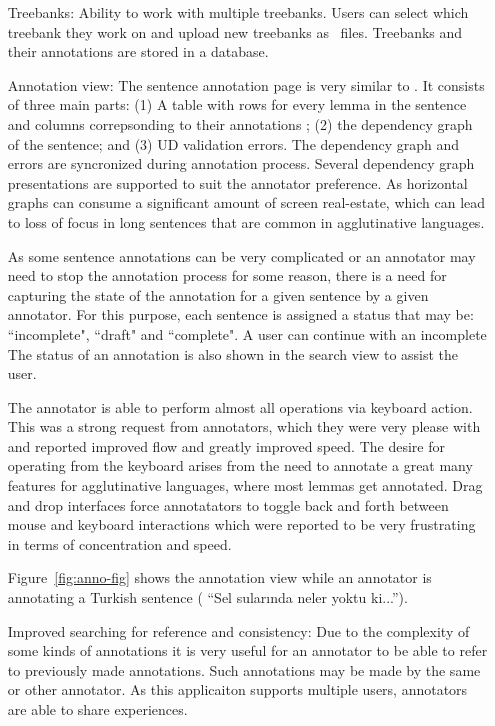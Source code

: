 \begin{itemize}[before=\normalfont, font=\itshape, align=left]
    \item[Treebanks:]
        Ability to work with multiple treebanks. Users can select which treebank they work on and upload new treebanks as \conllu\ files.  
        Treebanks and their annotations are stored in a database. 

    \item[Annotation view:]
    	The sentence annotation page is very similar to  \boatvone.
    	It consists of three main parts: (1) A table with rows for every lemma in the sentence and columns correpsonding to their annotations  ; (2) the dependency graph of the sentence; and (3) UD validation errors. 
    	The dependency graph and errors are syncronized during annotation process. 
        Several  dependency graph presentations are supported to suit the annotator preference. 
        As horizontal graphs can consume a significant amount of screen real-estate, which can lead to loss of focus in long sentences that are common in agglutinative languages. 
        
        As some sentence annotations can be very complicated or an annotator may need to stop the annotation process for some reason, there is a need for capturing the state of the annotation for a given sentence by a given annotator. For this purpose, each sentence is assigned a status that may be:    ``incomplete", ``draft" and ``complete". A user can continue with an incomplete 
       The status of an annotation is also shown in the search view to assist the user. 
       
       The annotator is able to perform almost all operations via keyboard action.
       This was a strong request from annotators, which they were very please with and reported improved flow and greatly improved speed.
       The desire for operating from the keyboard arises from the need to annotate a great many features for agglutinative languages, where most lemmas get annotated. Drag and drop interfaces force annotatators to toggle back and forth between mouse and keyboard interactions which were reported to be very frustrating in terms of concentration and speed. 
       
       Figure~\ref{fig:anno-fig} shows the annotation view while an annotator is annotating a Turkish sentence ( ``Sel sularında neler yoktu ki...''). 
        
    \item[Improved searching for reference and consistency:]
    	Due to the complexity of some kinds of annotations it is very useful for an annotator to be able to refer to previously made annotations.
    	Such annotations may be made by the same or other annotator. 
    	As this applicaiton supports multiple users, annotators are able to share experiences.


\end{itemize}
